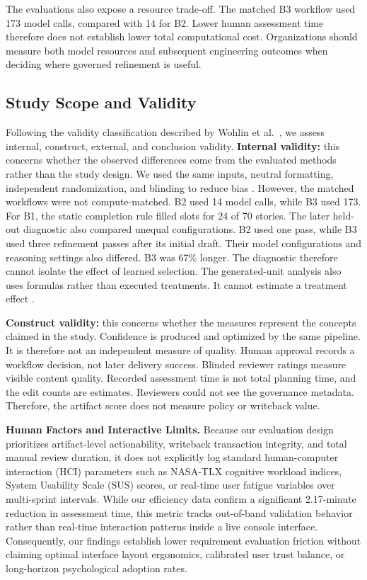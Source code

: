 \documentclass[manuscript,review]{acmart}
\begin{document}
The evaluations also expose a resource trade-off. The matched B3 workflow used 173 model calls, compared with 14 for B2. Lower human assessment time therefore does not establish lower total computational cost. Organizations should measure both model resources and subsequent engineering outcomes when deciding where governed refinement is useful.

\subsection{Study Scope and Validity}
Following the validity classification described by Wohlin et al.~\cite{R55}, we assess internal, construct, external, and conclusion validity.
\textbf{Internal validity:} this concerns whether the observed differences come from the evaluated methods rather than the study design. We used the same inputs, neutral formatting, independent randomization, and blinding to reduce bias \cite{R55}. However, the matched workflows were not compute-matched. B2 used 14 model calls, while B3 used 173. For B1, the static completion rule filled slots for 24 of 70 stories. The later held-out diagnostic also compared unequal configurations. B2 used one pass, while B3 used three refinement passes after its initial draft. Their model configurations and reasoning settings also differed. B3 was 67\% longer. The diagnostic therefore cannot isolate the effect of learned selection. The generated-unit analysis also uses formulas rather than executed treatments. It cannot estimate a treatment effect \cite{R71}.

\textbf{Construct validity:} this concerns whether the measures represent the concepts claimed in the study. Confidence is produced and optimized by the same pipeline. It is therefore not an independent measure of quality. Human approval records a workflow decision, not later delivery success. Blinded reviewer ratings measure visible content quality. Recorded assessment time is not total planning time, and the edit counts are estimates. Reviewers could not see the governance metadata. Therefore, the artifact score does not measure policy or writeback value.

\noindent\textbf{Human Factors and Interactive Limits.} Because our evaluation design prioritizes artifact-level actionability, writeback transaction integrity, and total manual review duration, it does not explicitly log standard human-computer interaction (HCI) parameters such as NASA-TLX cognitive workload indices, System Usability Scale (SUS) scores, or real-time user fatigue variables over multi-sprint intervals. While our efficiency data confirm a significant 2.17-minute reduction in assessment time, this metric tracks out-of-band validation behavior rather than real-time interaction patterns inside a live console interface. Consequently, our findings establish lower requirement evaluation friction without claiming optimal interface layout ergonomics, calibrated user trust balance, or long-horizon psychological adoption rates.
\end{document}
